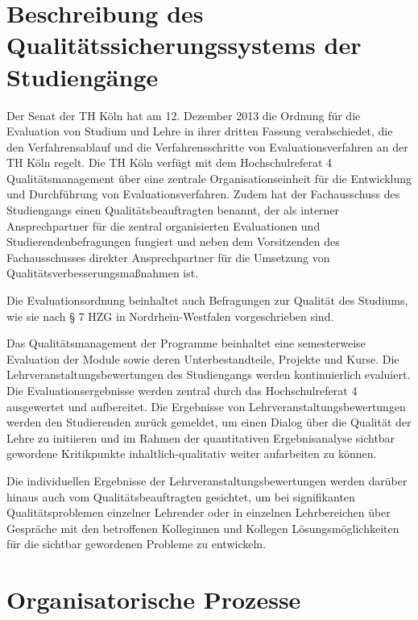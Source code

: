 \section{Beschreibung des Qualitätssicherungssystems der
Studiengänge}\label{beschreibung-des-qualituxe4tssicherungssystems-der-studienguxe4nge}

Der Senat der TH Köln hat am 12. Dezember 2013 die Ordnung für die
Evaluation von Studium und Lehre in ihrer dritten Fassung verabschiedet,
die den Verfahrensablauf und die Verfahrensschritte von
Evaluationsverfahren an der TH Köln regelt. Die TH Köln verfügt mit dem
Hochschulreferat 4 Qualitätsmanagement über eine zentrale
Organisationseinheit für die Entwicklung und Durchführung von
Evaluationsverfahren. Zudem hat der Fachausschuss des Studiengangs einen
Qualitätsbeauftragten benannt, der als interner Ansprechpartner für die
zentral organisierten Evaluationen und Studierendenbefragungen fungiert
und neben dem Vorsitzenden des Fachausschusses direkter Ansprechpartner
für die Umsetzung von Qualitätsverbesserungsmaßnahmen ist.

Die Evaluationsordnung beinhaltet auch Befragungen zur Qualität des
Studiums, wie sie nach § 7 HZG in Nordrhein-Westfalen vorgeschrieben
sind.

Das Qualitätsmanagement der Programme beinhaltet eine semesterweise
Evaluation der Module sowie deren Unterbestandteile, Projekte und Kurse.
Die Lehrveranstaltungsbewertungen des Studiengangs werden kontinuierlich
evaluiert. Die Evaluationsergebnisse werden zentral durch das
Hochschulreferat 4 ausgewertet und aufbereitet. Die Ergebnisse von
Lehrveranstaltungsbewertungen werden den Studierenden zurück gemeldet,
um einen Dialog über die Qualität der Lehre zu initiieren und im Rahmen
der quantitativen Ergebnisanalyse sichtbar gewordene Kritikpunkte
inhaltlich-qualitativ weiter aufarbeiten zu können.

Die individuellen Ergebnisse der Lehrveranstaltungsbewertungen werden
darüber hinaus auch vom Qualitätsbeauftragten gesichtet, um bei
signifikanten Qualitätsproblemen einzelner Lehrender oder in einzelnen
Lehrbereichen über Gespräche mit den betroffenen Kolleginnen und
Kollegen Lösungsmöglichkeiten für die sichtbar gewordenen Probleme zu
entwickeln.

\section{Organisatorische Prozesse}\label{organisatorische-prozesse}

